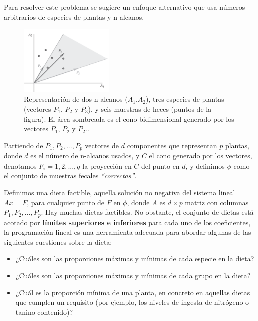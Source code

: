 Para resolver este problema se sugiere un enfoque alternativo que usa números arbitrarios de especies de plantas y n-alcanos.

\begin{figure}[h!] 
\centering
    \includegraphics[width=0.4\textwidth]{img/espacio03.png}
\caption{Representación de dos n-alcanos ($A_1$,$A_2$), tres especies de plantas (vectores $P_1$, $P_2$ y $P_3$), y seis muestras de heces (puntos de la figura). El área sombreada es el cono bidimensional generado por los vectores $P_1$, $P_2$ y $P_2$..}
\label{fig:espacio03}
\end{figure}

Partiendo de $P_1, P_2,...,P_p$ vectores de $d$ componentes que representan $p$ plantas, donde $d$ es el número de n-alcanos usados, y $C$ el cono generado por los vectores, denotamos $F_i = 1,2,...,q$ la proyección en $C$ del punto en $d$, y definimos $\phi$ como el conjunto de muestras fecales \textit{``correctas''}.

Definimos una dieta factible, aquella solución no negativa del sistema lineal $Ax=F$, para cualquier punto de $F$ en $\phi$, donde $A$ es $d \times p$ matriz con columnas $P_1, P_2,...,P_p$. Hay muchas dietas factibles. No obstante, el conjunto de dietas está acotado por \textbf{límites superiores e inferiores} para cada uno de los coeficientes, la programación lineal es una herramienta adecuada para abordar algunas de las siguientes cuestiones sobre la dieta:

\begin{itemize}
    \item ¿Cuáles son las proporciones máximas y mínimas de cada especie en la dieta?
    \item ¿Cuáles son las proporciones máximas y mínimas de cada grupo en la dieta?
    \item ¿Cuál es la proporción mínima de una planta, en concreto  en aquellas dietas que cumplen un requisito (por ejemplo, los niveles de ingesta de nitrógeno o tanino contenido)?
\end{itemize}



